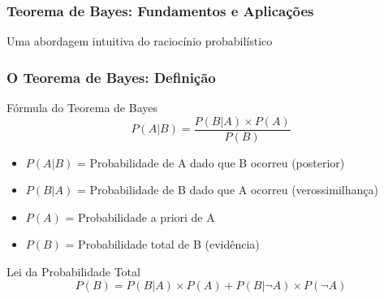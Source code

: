\documentclass[11pt]{beamer}
\begin{document}
\begin{frame}
\frametitle{Teorema de Bayes: Fundamentos e Aplicações}
\begin{center}
\Large{Uma abordagem intuitiva do raciocínio probabilístico}
\end{center}
\end{frame}

\begin{frame}
\frametitle{O Teorema de Bayes: Definição}
\begin{block}{Fórmula do Teorema de Bayes}
\begin{equation*}
P(A|B) = \frac{P(B|A) \times P(A)}{P(B)}
\end{equation*}
\end{block}

\begin{itemize}
\item $P(A|B)$ = Probabilidade de A dado que B ocorreu (posterior)
\item $P(B|A)$ = Probabilidade de B dado que A ocorreu (verossimilhança)
\item $P(A)$ = Probabilidade a priori de A
\item $P(B)$ = Probabilidade total de B (evidência)
\end{itemize}

\begin{block}{Lei da Probabilidade Total}
\begin{equation*}
P(B) = P(B|A) \times P(A) + P(B|\neg A) \times P(\neg A)
\end{equation*}
\end{block}
\end{frame}
\end{document}
